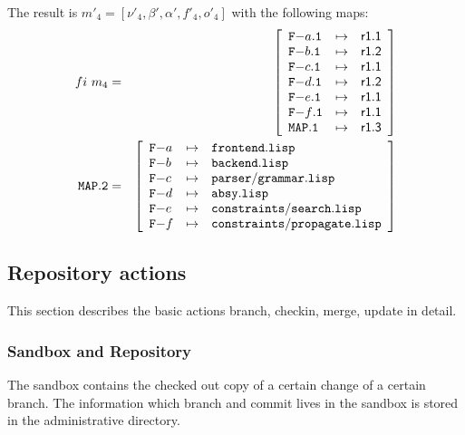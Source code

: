 \documentclass[fleqn, 10pt, a4paper]{article}
\begin{document}
The result is $m'_4=[\nu'_4, \beta', \alpha', f'_4, o'_4]$ with the
following maps:
\begin{eqnarray*}
\mathnormal{fi}\ m_4 &=& \left[
\begin{array}{lcl}
\mathtt{F-}a\mathtt{.1} & \mapsto & \mathsf{r1.1} \\
\mathtt{F-}b\mathtt{.1} & \mapsto & \mathsf{r1.2} \\
\mathtt{F-}c\mathtt{.1} & \mapsto & \mathsf{r1.1} \\
\mathtt{F-}d\mathtt{.1} & \mapsto & \mathsf{r1.2} \\
\mathtt{F-}e\mathtt{.1} & \mapsto & \mathsf{r1.1} \\
\mathtt{F-}f\mathtt{.1} & \mapsto & \mathsf{r1.1} \\
\mathtt{MAP.1}         & \mapsto & \mathsf{r1.3} \\
\end{array}\right] \\
\mathtt{MAP.2} &=& \left[
\begin{array}{lcl}
\mathtt{F-}a &\mapsto& \mathtt{frontend.lisp} \\
\mathtt{F-}b &\mapsto& \mathtt{backend.lisp} \\
\mathtt{F-}c &\mapsto& \mathtt{parser/grammar.lisp} \\
\mathtt{F-}d &\mapsto& \mathtt{absy.lisp} \\
\mathtt{F-}e &\mapsto& \mathtt{constraints/search.lisp} \\
\mathtt{F-}f &\mapsto& \mathtt{constraints/propagate.lisp} \\
\end{array}\right]
\end{eqnarray*}


\subsection{Repository actions \label{ops}}

This section describes the basic actions branch, checkin, merge,
update in detail.

\subsubsection{Sandbox and Repository}

The sandbox contains the checked out copy of a certain change
of a certain branch. The information which branch and
commit lives in the sandbox is stored in the administrative
directory.
\end{document}
